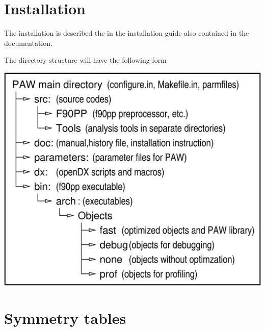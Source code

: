 \documentclass[final,12pt]{article}
\begin{document}
{{{{{{\appendix
\section{Installation}
The installation is described the in the installation guide also
contained in the documentation.

The directory structure will have the following form
\begin{center}
\includegraphics[width=0.8\linewidth]{Figs/PAWdirtree/pawdirtree.eps}
\end{center}



\newpage
\section{Symmetry tables}\label{section:symmetry_tables}
}}}}}}
\end{document}
